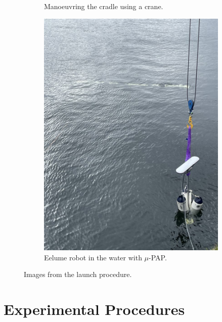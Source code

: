 \begin{figure}
\begin{subfigure}{0.26\textwidth}
        \caption{Manoeuvring the cradle using a crane.}
    \end{subfigure}
    \begin{subfigure}{0.26\textwidth}
        \centering
        \includegraphics[width=\textwidth]{assets/launch/1.jpeg}
        \caption{Eelume robot in the water with \(\mu\)-PAP.}
    \end{subfigure}
    \caption{Images from the launch procedure.}
    \label{fig:eelume:cradle-and-float}
\end{figure}

\iffalse
\section{Experimental Procedures}
\label{sec:experimental_setup:experimental_procedures}

